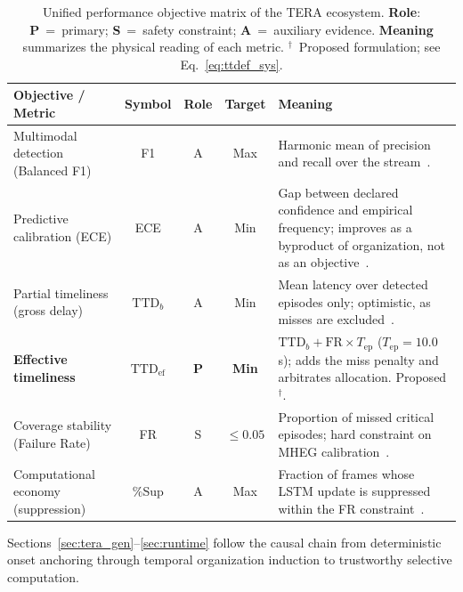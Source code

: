\documentclass[a4paper,fleqn]{cas-dc}
\begin{document}
\begin{table}[!tbp]
\centering
\caption{Unified performance objective matrix of the TERA ecosystem.
\textbf{Role}: \textbf{P}~=~primary; \textbf{S}~=~safety constraint;
\textbf{A}~=~auxiliary evidence. \textbf{Meaning} summarizes the physical
reading of each metric. $^\dagger$~Proposed formulation; see
Eq.~\ref{eq:ttdef_sys}.}
\label{tab:objetivos_expandida}
\footnotesize
\setlength{\tabcolsep}{4pt}
\renewcommand{\arraystretch}{1.12}
\begin{tabularx}{\textwidth}{>{\raggedright\arraybackslash}p{2.9cm}
  c c c
  >{\raggedright\arraybackslash}X}
\toprule
\textbf{Objective / Metric} & \textbf{Symbol}
  & \textbf{Role} & \textbf{Target} & \textbf{Meaning} \\
\midrule
Multimodal detection (Balanced F1)
  & F1 & A & Max
  & Harmonic mean of precision and recall over the stream~\cite{chinchor1992muc}. \\
\rowcolor{gray!8}
Predictive calibration (ECE)
  & ECE & A & Min
  & Gap between declared confidence and empirical frequency; improves as a
    byproduct of organization, not as an objective~\cite{guo2017calibration}. \\
Partial timeliness (gross delay)
  & $\mathrm{TTD}_{b}$ & A & Min
  & Mean latency over detected episodes only; optimistic, as misses are
    excluded~\cite{fawcett1999activity}. \\
\rowcolor{blue!6}
\textbf{Effective timeliness}
  & $\mathrm{TTD}_{\mathrm{ef}}$ & \textbf{P} & \textbf{Min}
  & $\mathrm{TTD}_{b} + \mathrm{FR}\times T_{\mathrm{ep}}$ ($T_{\mathrm{ep}}{=}10.0$\,s);
    adds the miss penalty and arbitrates allocation. Proposed$^\dagger$. \\
\rowcolor{gray!8}
Coverage stability (Failure Rate)
  & FR & S & $\le 0.05$
  & Proportion of missed critical episodes; hard constraint on MHEG
    calibration~\cite{iso26262}. \\
Computational economy (suppression)
  & \%Sup & A & Max
  & Fraction of frames whose LSTM update is suppressed within the FR
    constraint~\cite{campos2018skip}. \\
\bottomrule
\end{tabularx}
\end{table}
Sections~\ref{sec:tera_gen}--\ref{sec:runtime} follow the causal chain from deterministic onset anchoring through temporal organization induction to trustworthy selective computation.
\end{document}

